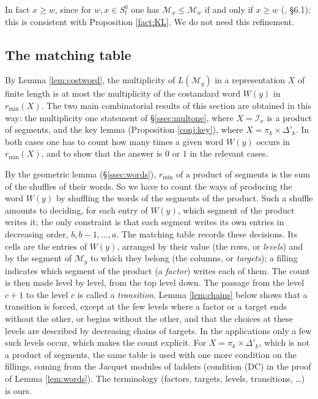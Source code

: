 \documentclass[a4paper,12pt,leqno]{amsart}
\newcommand{\caI}{\mathcal{I}}
\newcommand{\caM}{\mathcal{M}}
\theoremstyle{plain}
\theoremstyle{definition}
\theoremstyle{definition}
\begin{document}
\noindent In fact $x\geq w$, since for $w,x\in S_t^0$ one has $\caM_x\leq\caM_w$ if and only if $x\geq w$
(\cite{LM13}, \S6.1); this is consistent with Proposition \ref{fact:KL}. We do not need this
refinement.


\subsection{The matching table}\label{ssec:matching}
 By Lemma \ref{lem:costword}, the multiplicity of $L(\caM_y)$ in a
representation $X$ of finite length is at most the multiplicity of the costandard word $W(y)$ in
$r_{\min}(X)$. The two main combinatorial results of this section are obtained in this way: the
multiplicity one statement of \S\ref{ssec:multone}, where $X=\caI_x$ is a product of segments, and
the key lemma (Proposition \ref{conj:key}), where $X=\pi_k\times\Delta'_k$. In both cases one has to
count how many times a given word $W(y)$ occurs in $r_{\min}(X)$, and to show that the answer is $0$
or $1$ in the relevant cases.

By the geometric lemma (\S\ref{ssec:words}), $r_{\min}$ of a product of segments is the sum of the
shuffles of their words. So we have to count the ways of producing the word $W(y)$ by shuffling the
words of the segments of the product. Such a shuffle amounts to deciding, for each entry of $W(y)$,
which segment of the product writes it; the only constraint is that each segment writes its own
entries in decreasing order, $b,b-1,\ldots,a$. The matching table records these decisions. Its cells
are the entries of $W(y)$, arranged by their value (the rows, or \emph{levels}) and by the segment of
$\caM_y$ to which they belong (the columns, or \emph{targets}); a filling indicates which segment of
the product (a \emph{factor}) writes each of them. The count is then made level by level, from the
top level down. The passage from the level $c+1$ to the level $c$ is called a \emph{transition}.
Lemma \ref{lem:chains} below shows that a transition is forced, except at the few levels where a
factor or a target ends without the other, or begins without the other, and that the choices at these
levels are described by decreasing chains of targets. In the applications only a few such levels
occur, which makes the count explicit. For $X=\pi_k\times\Delta'_k$, which is not a product of
segments, the same table is used with one more condition on the fillings, coming from the Jacquet
modules of ladders (condition (DC) in the proof of Lemma \ref{lem:words}). The terminology (factors, targets, levels, transitions,
\ldots) is ours.
\end{document}
